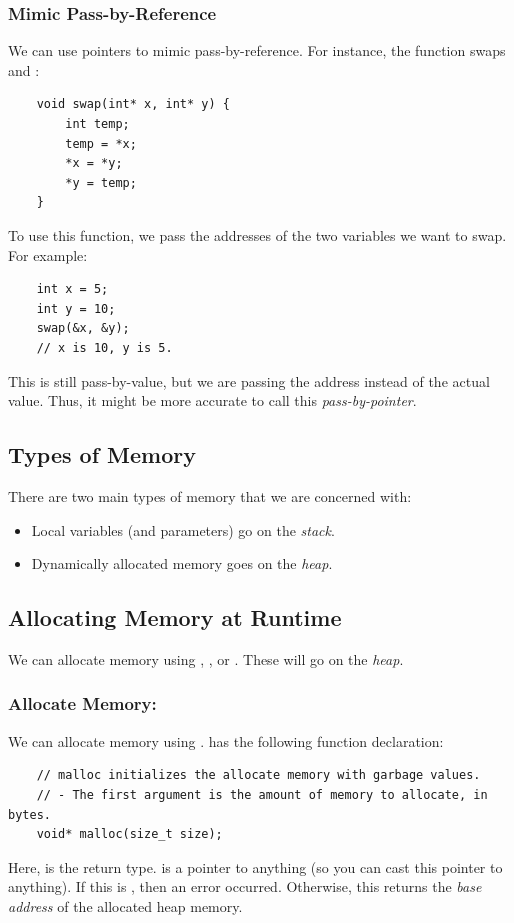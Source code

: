 \documentclass[letterpaper]{article}
\begin{document}
\subsubsection{Mimic Pass-by-Reference}
We can use pointers to mimic pass-by-reference. For instance, the  function swaps  and :
\begin{verbatim}
    void swap(int* x, int* y) {
        int temp; 
        temp = *x; 
        *x = *y; 
        *y = temp;
    }
\end{verbatim}
To use this function, we pass the addresses of the two variables we want to swap. For example:
\begin{verbatim}
    int x = 5;
    int y = 10;
    swap(&x, &y); 
    // x is 10, y is 5. 
\end{verbatim}
This is still pass-by-value, but we are passing the address instead of the actual value. Thus, it might be more accurate to call this \emph{pass-by-pointer}.

\subsection{Types of Memory}
There are two main types of memory that we are concerned with:
\begin{itemize}
    \item Local variables (and parameters) go on the \emph{stack}.
    \item Dynamically allocated memory goes on the \emph{heap}.
\end{itemize}

\subsection{Allocating Memory at Runtime}
We can allocate memory using , , or . These will go on the \emph{heap}. 

\subsubsection{Allocate Memory: }
We can allocate memory using .  has the following function declaration:
\begin{verbatim}
    // malloc initializes the allocate memory with garbage values.
    // - The first argument is the amount of memory to allocate, in bytes. 
    void* malloc(size_t size);
\end{verbatim}
Here,  is the return type.  is a pointer to anything (so you can cast this pointer to anything). If this is , then an error occurred. Otherwise, this returns the \emph{base address} of the allocated heap memory. 
\end{document}
